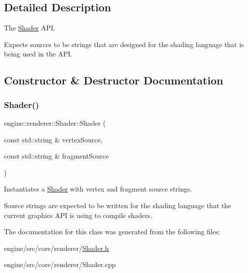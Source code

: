\subsection{Detailed Description}
The \hyperlink{classengine_1_1renderer_1_1Shader}{Shader} A\+PI. 

Expects sources to be strings that are designed for the shading language that is being used in the A\+PI. 

\subsection{Constructor \& Destructor Documentation}
\mbox{\label{classengine_1_1renderer_1_1Shader_a48fb2f9ae7b37051093275c2ecbbae9e}} 
\subsubsection{\texorpdfstring{Shader()}{Shader()}}
{\footnotesize\ttfamily engine\+::renderer\+::\+Shader\+::\+Shader (\begin{DoxyParamCaption}\item[{const std\+::string \&}]{vertex\+Source,  }\item[{const std\+::string \&}]{fragment\+Source }\end{DoxyParamCaption})}



Instantiates a \hyperlink{classengine_1_1renderer_1_1Shader}{Shader} with vertex and fragment source strings. 

Source strings are expected to be written for the shading language that the current graphics A\+PI is using to compile shaders. 

The documentation for this class was generated from the following files\+:\begin{DoxyCompactItemize}
\item 
engine/src/core/renderer/\hyperlink{Shader_8h}{Shader.\+h}\item 
engine/src/core/renderer/Shader.\+cpp\end{DoxyCompactItemize}
